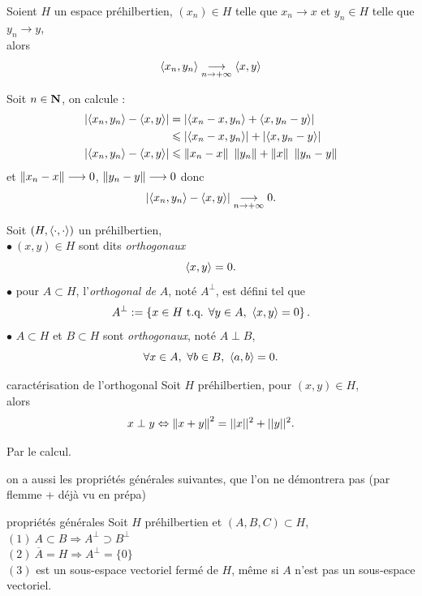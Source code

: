 \documentclass[a4paper,11pt, twoside]{article}
\begin{document}
\begin{prop}
  Soient $H$ un espace préhilbertien, $(x_n)\in H$ telle que $x_n\longrightarrow x$ et $y_n\in H$ telle que $y_n\longrightarrow y$,\\

  alors
  $$\langle x_n,y_n\rangle\underset{n\to+\infty}{\longrightarrow} \langle x,y\rangle$$
\end{prop}


\begin{Proof}
  Soit $n\in\mathbf N$, on calcule :
  \begin{align*}
    \left|\langle x_n,y_n\rangle-\left\langle x,y \right\rangle\right|&=\left| \left\langle x_n-x,y_n \right\rangle+\left\langle x,y_n-y \right\rangle\right|\\
    &\leqslant \left| \left\langle x_n-x,y_n \right\rangle\right|+\left| \left\langle x,y_n-y \right\rangle\right|\\
    \left|\langle x_n,y_n\rangle-\left\langle x,y \right\rangle\right|&\leqslant \left\lVert x_n-x\right\rVert\ \left\lVert y_n\right\rVert+\left\lVert x\right\rVert\ \left\lVert y_n-y\right\rVert
  \end{align*}
  et $\left\lVert x_n-x\right\rVert\longrightarrow 0$, $\left\lVert y_n-y\right\rVert\longrightarrow 0$ donc 
  $$\left|\langle x_n,y_n\rangle-\left\langle x,y \right\rangle\right|\underset{n\to+\infty}{\longrightarrow} 0.$$
\end{Proof}


\begin{Def}
  Soit $(H,\left\langle \cdot,\cdot \right\rangle)$ un préhilbertien,\\
  $\bullet\ (x,y)\in H$ sont dits \emph{orthogonaux} \ssi 
  $$\left\langle x,y \right\rangle=0.$$
  $\bullet$ pour $A\subset H$, l'\emph{orthogonal de }$A$, noté $A^\bot$, est défini tel que 
  $$A^\bot:=\left\{x\in H\text{ t.q. } \forall y\in A,\ \left\langle x,y \right\rangle=0\right\}.$$
  $\bullet$ $A\subset H$ et $B\subset H$ sont \emph{orthogonaux}, noté $A\perp B$, \ssi
  $$\forall x\in A,\ \forall b\in B,\ \ps{a,b}=0.$$
\end{Def}


\begin{propC}{caractérisation de l'orthogonal}
  Soit $H$ préhilbertien, pour $(x,y)\in H$,\\

  alors 
  $$x\perp y\Leftrightarrow \left\lVert x+y\right\rVert^2=||x||^2+||y||^2.$$
\end{propC}


\begin{Proof}
  Par le calcul.
\end{Proof}


on a aussi les propriétés générales suivantes, que l'on ne démontrera pas (par flemme + déjà vu en prépa)


\begin{propC}{propriétés générales}
  Soit $H$ préhilbertien et $(A,B,C)\subset H$,\\

  $(\mathit 1)\ A\subset B\Rightarrow A^\bot\supset B^\bot$\\
  $(\mathit 2)\ \overline{A}=H\Rightarrow A^\bot=\{0\}$\\
  $(\mathit 3)$ est un sous-espace vectoriel fermé de $H$, même si $A$ n'est pas un sous-espace vectoriel.
\end{propC}
\end{document}

